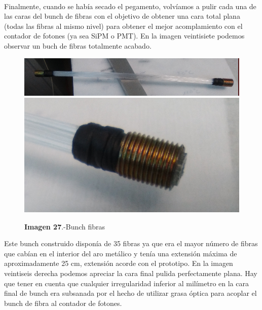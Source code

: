 \paragraph {}
Finalmente, cuando se había secado el pegamento, volvíamos a pulir cada una de las caras del bunch de fibras con el objetivo de obtener una cara total plana (todas las fibras al mismo nivel) para obtener el mejor acomplamiento con el contador de fotones (ya sea SiPM o PMT). En la imagen veintisiete podemos observar un buch de fibras totalmente acabado.

\begin{figure}[htb]
\centering
{
\includegraphics[scale=0.2]{bunchfibras.png} 
}
{
\includegraphics[scale=0.2]{bunchfibras1.png} 
}
\caption{\textbf{Imagen 27}.-Bunch fibras}
\end{figure} 

Este bunch construido disponía de 35 fibras ya que era el mayor número de fibras que cabían en el interior del aro metálico y tenía una extensión máxima de aproximadamente 25 cm, extensión acorde con el prototipo. En la imagen veintiseis derecha podemos apreciar la cara final pulida perfectamente plana. Hay que tener en cuenta que cualquier irregularidad inferior al milímetro en la cara final de bunch era subsanada por el hecho de utilizar grasa óptica para acoplar el bunch de fibra al contador de fotones.

\newpage